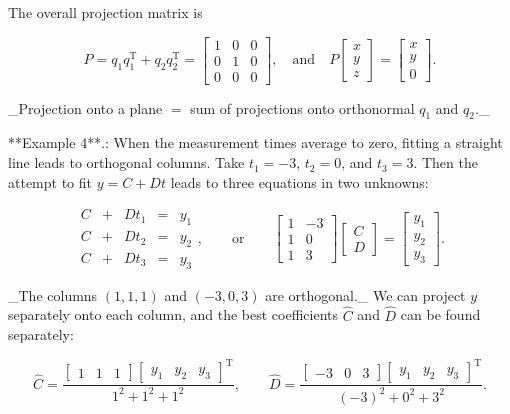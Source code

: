 The overall projection matrix is

\[P=q_{1}q_{1}^{\mathrm{T}}+q_{2}q_{2}^{\mathrm{T}}=\begin{bmatrix}1&0&0\\ 0&1&0\\ 0&0&0\end{bmatrix},\quad\text{and}\quad P\begin{bmatrix}x\\ y\\ z\end{bmatrix}=\begin{bmatrix}x\\ y\\ 0\end{bmatrix}.\]

_Projection onto a plane \(=\) sum of projections onto orthonormal \(q_{1}\) and \(q_{2}\)._

**Example 4**.: When the measurement times average to zero, fitting a straight line leads to orthogonal columns. Take \(t_{1}=-3\), \(t_{2}=0\), and \(t_{3}=3\). Then the attempt to fit \(y=C+Dt\) leads to three equations in two unknowns:

\[\begin{array}{ccccc}C&+&Dt_{1}&=&y_{1}\\ C&+&Dt_{2}&=&y_{2}\\ C&+&Dt_{3}&=&y_{3}\end{array},\qquad\text{or}\qquad\begin{bmatrix}1&-3\\ 1&0\\ 1&3\end{bmatrix}\begin{bmatrix}C\\ D\end{bmatrix}=\begin{bmatrix}y_{1}\\ y_{2}\\ y_{3}\end{bmatrix}.\]

_The columns \((1,1,1)\) and \((-3,0,3)\) are orthogonal._ We can project \(y\) separately onto each column, and the best coefficients \(\widehat{C}\) and \(\widehat{D}\) can be found separately:

\[\widehat{C}=\frac{\begin{bmatrix}1&1&1\end{bmatrix}\begin{bmatrix}y_{1}&y_{2} &y_{3}\end{bmatrix}^{\mathrm{T}}}{1^{2}+1^{2}+1^{2}},\qquad\widehat{D}=\frac{ \begin{bmatrix}-3&0&3\end{bmatrix}\begin{bmatrix}y_{1}&y_{2}&y_{3}\end{bmatrix} ^{\mathrm{T}}}{(-3)^{2}+0^{2}+3^{2}}.\]

